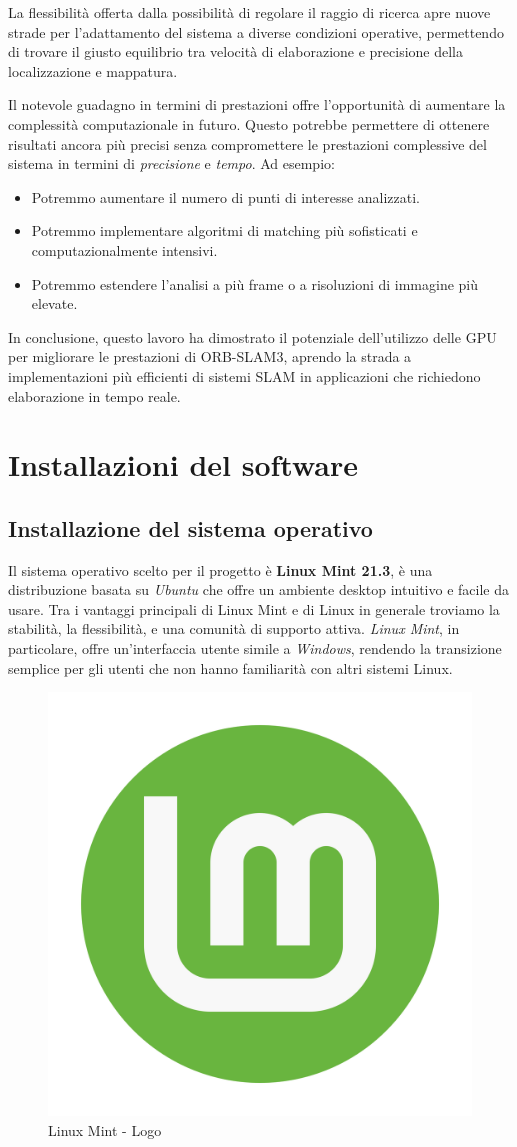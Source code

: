 \documentclass[12pt,a4paper]{report}
\begin{document}
La flessibilità offerta dalla possibilità di regolare il raggio di ricerca apre nuove strade per l'adattamento del sistema a diverse condizioni operative, permettendo di trovare il giusto equilibrio tra velocità di elaborazione e precisione della localizzazione e mappatura.

Il notevole guadagno in termini di prestazioni offre l'opportunità di aumentare la complessità computazionale in futuro. Questo potrebbe permettere di ottenere risultati ancora più precisi senza compromettere le prestazioni complessive del sistema in termini di \textit{precisione} e \textit{tempo}. Ad esempio:
\begin{itemize}
\item Potremmo aumentare il numero di punti di interesse analizzati.
\item Potremmo implementare algoritmi di matching più sofisticati e computazionalmente intensivi.
\item Potremmo estendere l'analisi a più frame o a risoluzioni di immagine più elevate.
\end{itemize}

In conclusione, questo lavoro ha dimostrato il potenziale dell'utilizzo delle GPU per migliorare le prestazioni di ORB-SLAM3, aprendo la strada a implementazioni più efficienti di sistemi SLAM in applicazioni che richiedono elaborazione in tempo reale.


\appendix

\chapter{Installazioni del software}

\section{Installazione del sistema operativo}

Il sistema operativo scelto per il progetto è \textbf{Linux Mint 21.3}, è una distribuzione basata su \textit{Ubuntu} che offre un ambiente desktop intuitivo e facile da usare. Tra i vantaggi principali di Linux Mint e di Linux in generale troviamo la stabilità, la flessibilità, e una comunità di supporto attiva. \textit{Linux Mint}, in particolare, offre un'interfaccia utente simile a \textit{Windows}, rendendo la transizione semplice per gli utenti che non hanno familiarità con altri sistemi Linux.

\begin{figure}[h]
    \centering
    \includegraphics[width=0.2\linewidth]{img/mint_logo.png}
    \caption{Linux Mint - Logo}
\end{figure}
\end{document}
